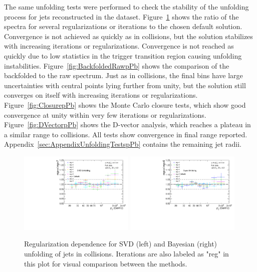 The same unfolding tests were performed to check the stability of the unfolding process for jets reconstructed in the \pPb dataset. Figure~\ref{fig:RegIterpPb} shows the ratio of the spectra for several regularizations or iterations to the chosen default solution. Convergence is not achieved as quickly as in \pp collisions, but the solution stabilizes with increasing iterations or regularizations. Convergence is not reached as quickly due to low statistics in the trigger transition region causing unfolding instabilities. Figure~\ref{fig:BackfoldedRawpPb} shows the comparison of the backfolded to the raw spectrum. Just as in \pp collisions, the final bins have large uncertainties with central points lying further from unity, but the solution still converges on itself with increasing iterations or regularizations. Figure~\ref{fig:ClosurepPb} shows the Monte Carlo closure tests, which show good convergence at unity within very few iterations or regularizations. Figure~\ref{fig:DVectorpPb} shows the D-vector analysis, which reaches a plateau in a similar range to \pp collisions. All tests show convergence in final \pT range reported. Appendix~\ref{sec:AppendixUnfoldingTestspPb} contains the remaining jet radii.


\begin{figure}[hbt!]
    \centering
    \begin{multicols}{2}
            \includegraphics[width=0.49\textwidth]{figures/pPbFigures/UnfoldingComparisons/Regularizations/RatioRegularizationSvd_R02.pdf}
        \vfill\null 
        \columnbreak
            \includegraphics[width=0.49\textwidth]{figures/pPbFigures/UnfoldingComparisons/Regularizations/RatioRegularizationBayes_R02.pdf}
        \vfill\null
    \end{multicols}
    \caption{Regularization dependence for SVD (left) and Bayesian (right) unfolding of jets in \pPb collisions. Iterations are also labeled as "reg" in this plot for visual comparison between the methods.}
    \label{fig:RegIterpPb}
\end{figure}




